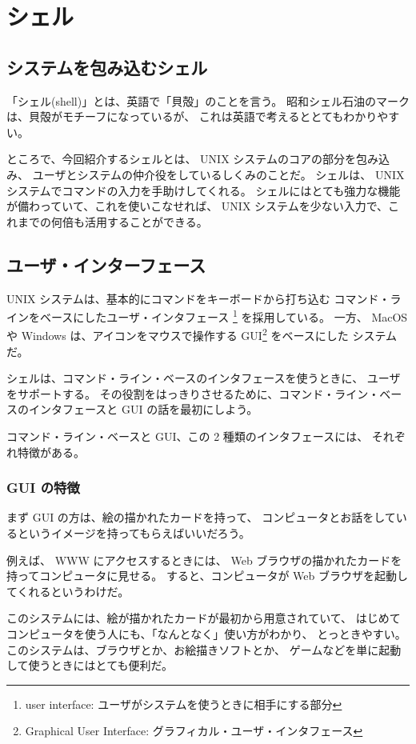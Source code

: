 \chapter{シェル}

\section*{システムを包み込むシェル}

「シェル(shell)」とは、英語で「貝殻」のことを言う。
昭和シェル石油のマークは、貝殻がモチーフになっているが、
これは英語で考えるととてもわかりやすい。

ところで、今回紹介するシェルとは、 UNIX システムのコアの部分を包み込み、
ユーザとシステムの仲介役をしているしくみのことだ。
シェルは、 UNIX システムでコマンドの入力を手助けしてくれる。
シェルにはとても強力な機能が備わっていて、これを使いこなせれば、
 UNIX システムを少ない入力で、これまでの何倍も活用することができる。

\section{ユーザ・インターフェース}

 UNIX システムは、基本的にコマンドをキーボードから打ち込む
コマンド・ラインをベースにしたユーザ・インタフェース
\footnote{user interface: ユーザがシステムを使うときに相手にする部分}
を採用している。
一方、 MacOS や Windows は、アイコンをマウスで操作する GUI\footnote{Graphical
User Interface: グラフィカル・ユーザ・インタフェース} をベースにした
システムだ。

シェルは、コマンド・ライン・ベースのインタフェースを使うときに、
ユーザをサポートする。
その役割をはっきりさせるために、コマンド・ライン・ベースのインタフェースと
 GUI の話を最初にしよう。

コマンド・ライン・ベースと GUI、この 2 種類のインタフェースには、
それぞれ特徴がある。

\subsection{GUI の特徴}

まず GUI の方は、絵の描かれたカードを持って、
コンピュータとお話をしているというイメージを持ってもらえばいいだろう。

例えば、 WWW にアクセスするときには、 Web ブラウザの描かれたカードを
持ってコンピュータに見せる。
すると、コンピュータが Web ブラウザを起動してくれるというわけだ。

このシステムには、絵が描かれたカードが最初から用意されていて、
はじめてコンピュータを使う人にも、「なんとなく」使い方がわかり、
とっときやすい。
このシステムは、ブラウザとか、お絵描きソフトとか、
ゲームなどを単に起動して使うときにはとても便利だ。

